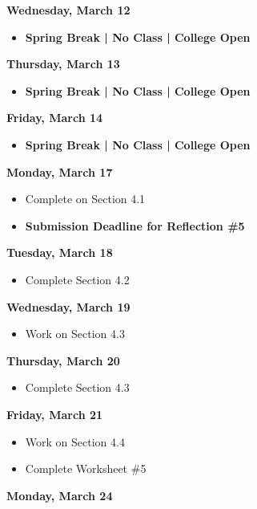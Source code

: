 \documentclass[11pt]{article}
\begin{document}
\textbf{Wednesday, March 12}

\begin{itemize}
\item \textbf{Spring Break | No Class | College Open}
\end{itemize}

\textbf{Thursday, March 13}

\begin{itemize}
\item \textbf{Spring Break | No Class | College Open}
\end{itemize}

\textbf{Friday, March 14}

\begin{itemize}
\item \textbf{Spring Break | No Class | College Open}
\end{itemize}

\textbf{Monday, March 17}

\begin{itemize}
\item Complete on Section 4.1
\item \textbf{Submission Deadline for Reflection \#5}
\end{itemize}

\textbf{Tuesday, March 18}

\begin{itemize}
\item Complete Section 4.2
\end{itemize}

\textbf{Wednesday, March 19}

\begin{itemize}
\item Work on Section 4.3
\end{itemize}

\textbf{Thursday, March 20}

\begin{itemize}
\item Complete Section 4.3
\end{itemize}

\textbf{Friday, March 21}

\begin{itemize}
\item Work on Section 4.4
\item Complete Worksheet \#5
\end{itemize}

\textbf{Monday, March 24}
\end{document}
